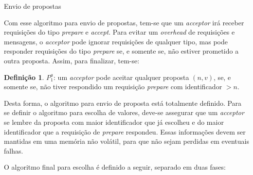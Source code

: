 \documentclass[
    12pt,
    openright, 
    oneside,
    a4paper,
    french,
    english,
    brazil
    ]{facom-ufu-abntex2}
\theoremstyle{definition}
\newtheorem{definition}{Definição}
\begin{document}
\begin{algorithm}[H]
\caption{Envio de propostas}
\SetAlgoLined
{}
\end{algorithm}

Com esse algoritmo para envio de propostas, tem-se que um \emph{acceptor} irá
receber requisições do tipo \emph{prepare} e \emph{accept}. Para evitar um \emph{overhead}
de requisições e mensagens, o \emph{acceptor} pode ignorar requisições de qualquer tipo,
mas pode responder requisições do tipo \emph{prepare} se, e somente se, não estiver
prometido a outra proposta. Assim, para finalizar, tem-se:

\begin{definition}
$P_1^a$: um \emph{acceptor} pode aceitar qualquer proposta $(n, v)$, se, e somente se, não tiver
respondido um requisição \emph{prepare} com identificador $>n$.
\end{definition}

Desta forma, o algoritmo para envio de proposta está totalmente definido. Para se definir
o algoritmo para escolha de valores, deve-se assegurar que um \emph{acceptor} se
lembre da proposta com maior identificador que já escolheu e do maior identificador
que a requisição de \emph{prepare} respondeu. Essas informações devem ser mantidas
em uma memória não volátil, para que não sejam perdidas em eventuais falhas.

O algoritmo final para escolha é definido a seguir, separado em duas fases:
\end{document}
